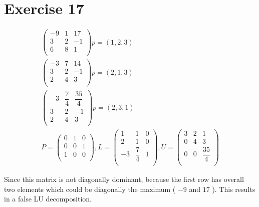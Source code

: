 \section{Exercise 17}
\begin{gather*}
\left( \begin{array}{ccc}
-9 & 1 & 17 \\
3 & 2 & -1 \\
6 & 8 & 1 \\
\end{array} \right) 
p = ( 1,2,3 )
\\
\left( \begin{array}{ccc}
-3 & 7 & 14 \\
3 & 2 & -1 \\
2 & 4 & 3 \\
\end{array} \right)  p = ( 2 ,1 ,3 )
\\
\left( \begin{array}{ccc}
-3 & \dfrac{7}{4} & \dfrac{35}{4} \\
3 & 2 & -1 \\
2 & 4 & 3 \\ 
\end{array} \right) p = ( 2, 3, 1 ) \\
P = \left( \begin{array}{ccc}
0 & 1 & 0 \\
0 & 0 & 1 \\
1 & 0 & 0 \\
\end{array} \right) ,
L = \left( \begin{array}{ccc}
1 & 1 & 0 \\
2 & 1 & 0 \\
-3 & \dfrac{7}{4} & 1 \\
\end{array} \right) , 
U = \left( \begin{array}{ccc}
3 & 2 & 1 \\
0 & 4 & 3 \\
0 & 0 & \dfrac{35}{4} \\
\end{array} \right) 
\end{gather*}

Since this matrix is not diagonally dominant, because the first row has overall two elements which could be diagonally the maximum ( $-9 $ and $17$ ). This results in a false LU decomposition.


